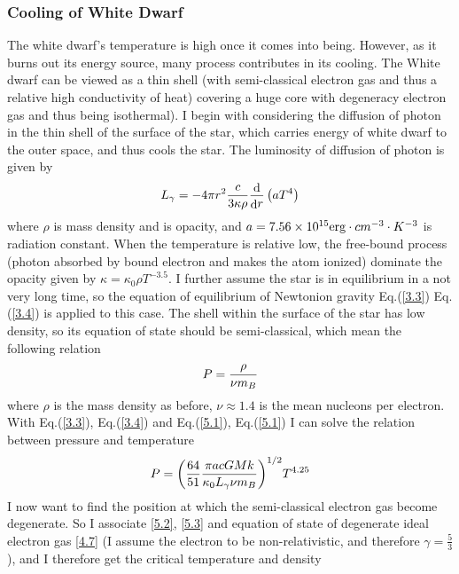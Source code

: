 \documentclass[preprint]{revtex4-1}
\begin{document}
\subsubsection{Cooling of White Dwarf}
The white dwarf’s temperature is high once it comes into being. However, as it burns out its energy source, many process contributes in its cooling. The White dwarf can be viewed as a thin shell (with semi-classical electron gas and thus a relative high conductivity of heat) covering a huge core with degeneracy electron gas and thus being isothermal). I begin with considering the diffusion of photon in the thin shell of the surface of the star, which carries energy of white dwarf to the outer space, and thus cools the star. The luminosity of diffusion of photon is given by 
\begin{equation}
{L_\gamma } =  - 4\pi {r^2}{c \over {3\kappa \rho }}{{\mathop{\rm d}\nolimits}  \over {{\mathop{\rm d}\nolimits} r}}\left( {a{T^4}} \right) \label{5.1}
\end{equation}
where $\rho$ is mass density and is opacity, and $a = 7.56 \times {10^{15}}{\rm{   }}{\mathop{\rm erg}\nolimits}  \cdot c{m^{ - 3}} \cdot {K^{ - 3}}$ is radiation constant. When the temperature is relative low, the free-bound process (photon absorbed by bound electron and makes the atom ionized) dominate the opacity given by $\kappa  = {\kappa _0}\rho {T^{ - 3.5}}$. I further assume the star is in equilibrium in a not very long time, so the equation of equilibrium of Newtonion gravity Eq.(\ref{3.3}) Eq.(\ref{3.4}) is applied to this case. The shell within the surface of the star has low density, so its equation of state should be semi-classical, which mean the following relation
\begin{equation}
P = {\rho  \over {\nu {m_B}}} \label{5.2}
\end{equation}
where $\rho$ is the mass density as before, $\nu\approx1.4$ is the mean nucleons per electron. With Eq.(\ref{3.3}), Eq.(\ref{3.4}) and Eq.(\ref{5.1}), Eq.(\ref{5.1}) I can solve the relation between pressure and temperature
\begin{equation}
P = {\left( {{{64} \over {51}}{{\pi acGMk} \over {{\kappa _0}{L_\gamma }\nu {m_B}}}} \right)^{1/2}}{T^{4.25}} \label{5.3}
\end{equation}
I now want to find the position at which the semi-classical electron gas become degenerate. So I associate \ref{5.2}, \ref{5.3} and equation of state of degenerate ideal electron gas \ref{4.7} (I assume the electron to be non-relativistic, and therefore $\gamma=\frac{5}{3}$), and I therefore get the critical temperature and density
\end{document}
